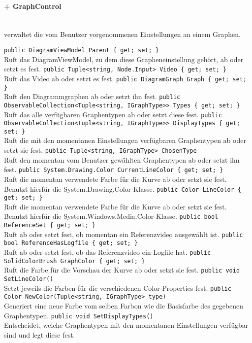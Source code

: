 \paragraph{+ GraphControl}~\\
 verwaltet die vom Benutzer vorgenommenen Einstellungen an einem Graphen.
\begin{itemize}
	\add \verb!public DiagramViewModel Parent { get; set; }! \\
	Ruft das DiagramViewModel, zu dem diese Grapheneinstellung gehört, ab oder setzt es fest.
	\add \verb!public Tuple<string, Node.Input> Video { get; set; }! \\
	Ruft das Video ab oder setzt es fest.
	\add \verb!public DiagramGraph Graph { get; set; }! \\
	Ruft den Diagrammgraphen ab oder setzt ihn fest.
	\add \verb!public ObservableCollection<Tuple<string, IGraphType>> Types { get; set; }! \\
	Ruft das alle verfügbaren Graphentypen ab oder setzt diese fest.
	\add \verb!public ObservableCollection<Tuple<string, IGraphType>> DisplayTypes { get; set; }! \\
	Ruft die mit den momentanen Einstellungen verfügbaren Graphentypen ab oder setzt sie fest.
	\add \verb!public Tuple<string, IGraphType> ChosenType! \\
	Ruft den momentan vom Benutzer gewählten Graphentypen ab oder setzt ihn fest.
	\add \verb!public System.Drawing.Color CurrentLineColor { get; set; }! \\
	Ruft die momentan verwendete Farbe für die Kurve ab oder setzt sie fest. Benutzt hierfür die System.Drawing.Color-Klasse.
	\add \verb!public Color LineColor { get; set; }! \\
	Ruft die momentan verwendete Farbe für die Kurve ab oder setzt sie fest. Benutzt hierfür die System.Windows.Media.Color-Klasse.
	\add \verb!public bool ReferenceSet { get; set; }! \\
	Ruft ab oder setzt fest, ob momentan ein Referenzvideo ausgewählt ist.
	\add \verb!public bool ReferenceHasLogfile { get; set; }! \\
	Ruft ab oder setzt fest, ob das Referenzvideo ein Logfile hat.
	\add \verb!public SolidColorBrush GraphColor { get; set; }! \\
	Ruft die Farbe für die Vorschau der Kurve ab oder setzt sie fest.
	\add \verb!public void SetLineColor()! \\
	Setzt jeweils die Farben für die verschiedenen Color-Properties fest.
	\add \verb!public Color NewColor(Tuple<string, IGraphType> type)! \\
	Generiert eine neue Farbe vom selben Farbon wie die Basisfarbe des gegebenen Graphentypen.
	\add \verb!public void SetDisplayTypes()! \\
	Entscheidet, welche Graphentypen mit den momentanen Einstellungen verfügbar sind und legt diese fest.
\end{itemize}

